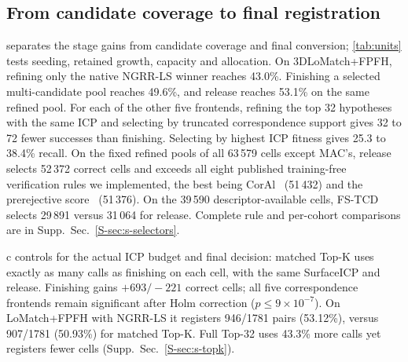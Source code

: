 \subsection{From candidate coverage to final registration}
\label{sec:verification}
\begin{table}[t]
\caption{Own-process controls. (a) Nested volume inputs, $K=256$, fixed count readout. (b) Same budget/backend; modes: mean distinct poses among 1024; coverage and registrations: pair counts. (c) Cells are frontend--input evaluations. Same ICP and release; Matched K matches finishing calls per cell, Full K uses the top-32 bank. Total calls: 1\,028\,539 for matched/finishing, 1\,474\,185 for full. MAC is excluded from (c).}
\label{tab:units}\centering
\end{table}
\begin{table}[t]
\caption{Registration recall (\%) as reported in each paper, next to ours on our inputs (Supp.~Sec.~\ref*{S-sec:s-literature}). *: from another paper's table; $^\dagger$: preprint. Bold / underline: best / second best.}
\label{tab:literature}
\centering
\end{table}



 separates the stage gains from candidate coverage and final conversion; \cref{tab:units} tests seeding, retained growth, capacity and allocation. On 3DLoMatch+FPFH, refining only the native NGRR-LS winner reaches 43.0\%. Finishing a selected multi-candidate pool reaches 49.6\%, and release reaches 53.1\% on the same refined pool. For each of the other five frontends, refining the top 32 hypotheses with the same ICP and selecting by truncated correspondence support gives 32 to 72 fewer successes than finishing. Selecting by highest ICP fitness gives 25.3 to 38.4\% recall. On the fixed refined pools of all 63\,579 cells except MAC's, release selects 52\,372 correct cells and exceeds all eight published training-free verification rules we implemented, the best being CorAl~\cite{adolfsson2021coral} (51\,432) and the prerejective score~\cite{buch2013prerejective} (51\,376). On the 39\,590 descriptor-available cells, FS-TCD~\cite{chen2023sc2pp} selects 29\,891 versus 31\,064 for release. Complete rule and per-cohort comparisons are in Supp.~Sec.~\ref*{S-sec:s-selectors}.

c controls for the actual ICP budget and final decision: matched Top-K uses exactly as many calls as finishing on each cell, with the same SurfaceICP and release. Finishing gains $+693/{-}221$ correct cells; all five correspondence frontends remain significant after Holm correction ($p\le9\times10^{-7}$). On LoMatch+FPFH with NGRR-LS it registers 946/1781 pairs (53.12\%), versus 907/1781 (50.93\%) for matched Top-K. Full Top-32 uses 43.3\% more calls yet registers fewer cells (Supp.~Sec.~\ref*{S-sec:s-topk}).

